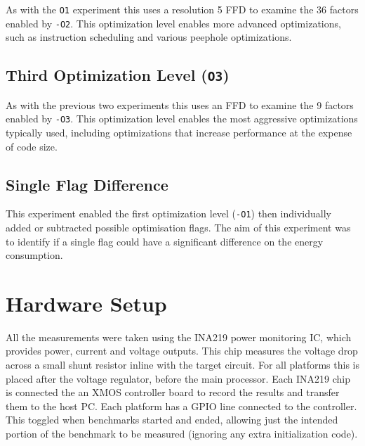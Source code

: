 \documentclass[twocolumn]{article}
\newcommand{\nsection}[1]{\section{\bfseries #1}}
\begin{document}
As with the \texttt{O1} experiment this uses a resolution 5 FFD to examine the 36 factors enabled by \texttt{-O2}. This optimization level enables more advanced optimizations, such as instruction scheduling and various peephole optimizations.

\subsection*{Third Optimization Level (\texttt{O3})}

As with the previous two experiments this uses an FFD to examine the 9 factors enabled by \texttt{-O3}. This optimization level enables the most aggressive optimizations typically used, including optimizations that increase performance at the expense of code size.



\subsection*{Single Flag Difference}

This experiment enabled the first optimization level (\texttt{-O1}) then individually added or subtracted possible optimisation flags. The aim of this experiment was to identify if a single flag could have a significant difference on the energy consumption.

\nsection{Hardware Setup}

All the measurements were taken using the INA219 power monitoring IC\cite{INA219}, which provides power, current and voltage outputs. This chip measures the voltage drop across a small shunt resistor inline with the target circuit. For all platforms this is placed after the voltage regulator, before the main processor. Each INA219 chip is connected the an XMOS controller board to record the results and transfer them to the host PC. Each platform has a GPIO line connected to the controller. This toggled when benchmarks started and ended, allowing just the intended portion of the benchmark to be measured (ignoring any extra initialization code).
\end{document}
